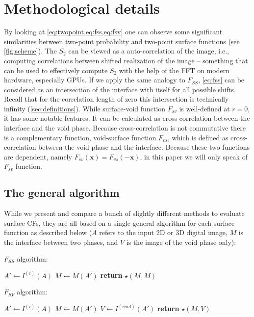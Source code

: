 \documentclass[reprint,amsmath,amssymb,aps,pre,showkeys,showpacs]{revtex4-1}
\begin{document}
\section{Methodological details}
\label{sec:details}
By looking at \cref{eq:twopoint,eq:fss,eq:fsv} one can observe
some significant similarities between two-point probability and two-point
surface functions (see \cref{fig:scheme}). The $S_2$ can be viewed as a
auto-correlation of the image, i.e., computing correlations between shifted
realization of the image\cite{Torquato_book} -- something that can be used to
effectively compute $S_2$ with the help of the FFT on modern hardware,
especially GPUs. If we apply the same analogy to $F_{SS}$, \cref{eq:fss} can be
considered as an intersection of the interface with itself for all possible
shifts\cite{PhysRevE.94.022122}. Recall that for the correlation length of zero
this intersection is technically infinity (\cref{sec:definitions}). While
surface-void function $F_{sv}$ is well-defined at $r=0$, it has some notable
features. It can be calculated as cross-correlation between the interface and
the void phase. Because cross-correlation is not commutative there is a
complementary function, void-surface function $F_{vs}$, which is defined as
cross-correlation between the void phase and the interface. Because these two
functions are dependent, namely $F_{sv}(\mathbf{x}) = F_{vs}(-\mathbf{x})$, in
this paper we will only speak of $F_{sv}$ function.

\subsection{The general algorithm}
\label{sec:general}
While we present and compare a bunch of slightly different methods to evaluate
surface CFs, they are all based on a single general algorithm for each surface
function as described below ($A$ refers to the input 2D or 3D digital image, $M$
is the interface between two phases, and $V$ is the image of the void phase
only):

$F_{SS}$ algorithm:
\begin{algorithmic}[1]
  \State $A' \gets I^{(i)}(A)$
  \State $M \gets M(A')$
  \State \textbf{return} $\star(M, M)$
  \EndProcedure
\end{algorithmic}

$F_{SV}$ algorithm:
\begin{algorithmic}[1]
  \State $A' \gets I^{(i)}(A)$
  \State $M \gets M(A')$
  \State $V \gets I^{(void)}(A')$
  \State \textbf{return} $\star(M, V)$
  \EndProcedure
\end{algorithmic}
\end{document}
